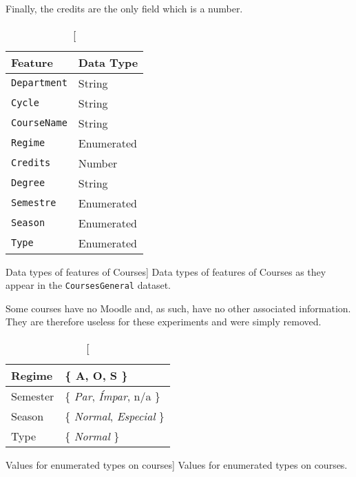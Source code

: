 Finally, the credits are the only field which is a number.

\begin{table}[h!]
    \centering

    \begin{tabular}{l l}
        Feature             & Data Type  \\ \hline
        \texttt{Department} & String     \\
        \texttt{Cycle}      & String     \\
        \texttt{CourseName} & String     \\
        \texttt{Regime}     & Enumerated \\
        \texttt{Credits}    & Number     \\
        \texttt{Degree}     & String     \\
        \texttt{Semestre}   & Enumerated \\
        \texttt{Season}     & Enumerated \\
        \texttt{Type}       & Enumerated \\
    \end{tabular}

    \caption
        [Data types of features of Courses]
        {Data types of features of Courses as they appear in the
        \texttt{CoursesGeneral} dataset.}

    \label{tab:courses_general_features}
\end{table}

Some courses have no Moodle and, as such, have no other associated information.
They are therefore useless for these experiments and were simply removed.

\begin{table}[h!]
    \centering

    \begin{tabular}{| l | l |}
        \hline
        Regime   & \{ A, O, S \}                            \\ \hline
        Semester & \{ \textit{Par}, \textit{Ímpar}, n/a \}  \\ \hline
        Season   & \{ \textit{Normal}, \textit{Especial} \} \\ \hline
        Type     & \{ \textit{Normal} \}                    \\ \hline
    \end{tabular}

    \caption
        [Values for enumerated types on courses]
        {Values for enumerated types on courses.}

    \label{tab:courses_enum}
\end{table}


